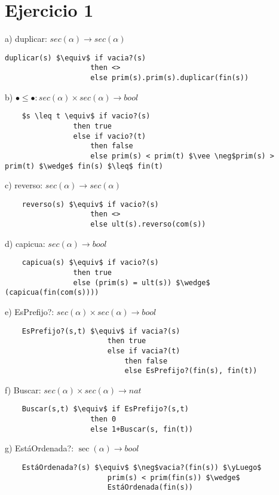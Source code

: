 \section{Ejercicio 1}

a) duplicar: $sec(\alpha) \rightarrow sec(\alpha)$
\begin{lstlisting}[mathescape=true]
    duplicar(s) $\equiv$ if vacia?(s)
                    then <>
                    else prim(s).prim(s).duplicar(fin(s))
\end{lstlisting}

b) $\bullet \leq \bullet : sec(\alpha) \times sec(\alpha) \rightarrow bool$
\begin{lstlisting}
    $s \leq t \equiv$ if vacio?(s)
                then true
                else if vacio?(t)
                    then false
                    else prim(s) < prim(t) $\vee \neg$prim(s) > prim(t) $\wedge$ fin(s) $\leq$ fin(t)
\end{lstlisting}

c) reverso: $sec(\alpha) \rightarrow sec(\alpha)$
\begin{lstlisting}
    reverso(s) $\equiv$ if vacio?(s)
                    then <>
                    else ult(s).reverso(com(s))
\end{lstlisting}

d) capicua: $sec(\alpha) \rightarrow bool$
\begin{lstlisting}
    capicua(s) $\equiv$ if vacio?(s)
                then true
                else (prim(s) = ult(s)) $\wedge$ (capicua(fin(com(s))))
\end{lstlisting}

e) EsPrefijo?: $sec(\alpha) \times sec(\alpha) \rightarrow bool$
\begin{lstlisting}
    EsPrefijo?(s,t) $\equiv$ if vacia?(s)
                        then true
                        else if vacia?(t)
                            then false
                            else EsPrefijo?(fin(s), fin(t))    
\end{lstlisting}

f) Buscar: $sec(\alpha) \times sec(\alpha) \rightarrow nat$
\begin{lstlisting}
    Buscar(s,t) $\equiv$ if EsPrefijo?(s,t)
                    then 0
                    else 1+Buscar(s, fin(t))
\end{lstlisting}

g) EstáOrdenada?: $\sec(\alpha) \rightarrow bool$
\begin{lstlisting}
    EstáOrdenada?(s) $\equiv$ $\neg$vacia?(fin(s)) $\yLuego$ 
                        prim(s) < prim(fin(s)) $\wedge$ 
                        EstáOrdenada(fin(s))
\end{lstlisting}

